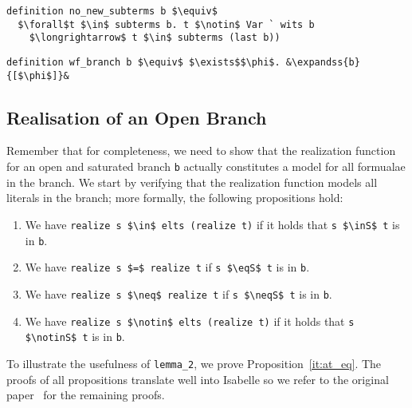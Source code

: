 \documentclass[sigplan,10pt,anonymous,review]{acmart}
\newcommand{\lefttriangle}{\mathrel{\tikz[baseline]{\draw (1ex, 0.75ex) -- (0, 1.25ex) -- (0, 0.25ex) -- cycle;}}}
\newcommand{\expandss}[2]{#1 $\lefttriangle^*$ #2}
\newcommand{\inS}{\in_\text{s}}
\newcommand{\notinS}{\notin_\text{s}}
\newcommand{\eqS}{=_\text{s}}
\newcommand{\neqS}{\neq_\text{s}}
\begin{document}
\begin{lstlisting}
definition no_new_subterms b $\equiv$
  $\forall$t $\in$ subterms b. t $\notin$ Var ` wits b
    $\longrightarrow$ t $\in$ subterms (last b))
\end{lstlisting}

\begin{lstlisting}
definition wf_branch b $\equiv$ $\exists$$\phi$. &\expandss{b}{[$\phi$]}&
\end{lstlisting}


\subsection{Realisation of an Open Branch}
Remember that for completeness, we need to show that the realization function for an open and saturated branch \lstinline!b! actually constitutes a model for all formualae in the branch.
We start by verifying that the realization function models all literals in the branch; more formally, the following propositions hold: 
\begin{enumerate}[label=(\roman*)]
  \item\label{it:at_mem} We have \lstinline!realize s $\in$ elts (realize t)! if it holds that \lstinline!s $\inS$ t! is in \lstinline!b!. 
  \item\label{it:at_eq} We have \lstinline!realize s $=$ realize t! if \lstinline!s $\eqS$ t! is in \lstinline!b!.
  \item We have \lstinline!realize s $\neq$ realize t! if \lstinline!s $\neqS$ t! is in \lstinline!b!.
  \item We have \lstinline!realize s $\notin$ elts (realize t)! if it holds that \lstinline!s $\notinS$ t! is in \lstinline!b!. 
\end{enumerate}
To illustrate the usefulness of \lstinline!lemma_2!, we prove Proposition~\ref{it:at_eq}.
The proofs of all propositions translate well into Isabelle so we refer to the original paper~\cite{new_fast_tableau} for the remaining proofs. 
\end{document}

